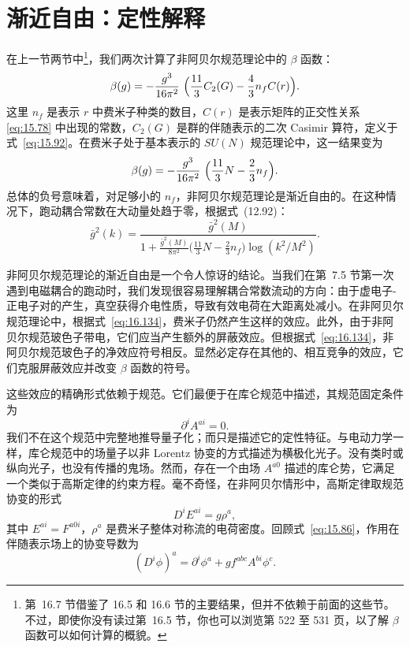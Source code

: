 \section{渐近自由：定性解释}

在上一节两节中\footnote{第~16.7 节借鉴了 16.5 和 16.6 节的主要结果，但并不依赖于前面的这些节。不过，即使你没有读过第~16.5 节，你也可以浏览第 522 至 531 页，以了解 $\beta$ 函数可以如何计算的概貌。}，我们两次计算了非阿贝尔规范理论中的 $\beta$ 函数：
\begin{equation}
  \beta(g) = -\frac{g^3}{16\pi^2}\ \Bigl( \frac{11}{3}C_2(G)
    - \frac{4}{3}n_fC(r) \Bigr) .
  \label{eq:16.134}
\end{equation}
这里 $n_f$ 是表示 $r$ 中费米子种类的数目，$C(r)$ 是表示矩阵的正交性关系 \eqref{eq:15.78} 中出现的常数，$C_2(G)$ 是群的伴随表示的二次 Casimir 算符，定义于式~\eqref{eq:15.92}。在费米子处于基本表示的 $SU(N)$ 规范理论中，这一结果变为
\begin{equation}
  \beta(g) = -\frac{g^3}{16\pi^2}\ \Bigl( \frac{11}{3}N
    - \frac{2}{3}n_f \Bigr) .
  \label{eq:16.135}
\end{equation}
总体的负号意味着，对足够小的 $n_f$，非阿贝尔规范理论是渐近自由的。在这种情况下，跑动耦合常数在大动量处趋于零，根据式~(12.92)：
\begin{equation}
  \bar{g}^2(k) = \frac{\bar{g}^2(M)}{1 +
    \frac{\bar{g}^2(M)}{8\pi^2}\bigl( \frac{11}{3}N - \frac{2}{3}n_f
      \bigr)\log(k^2/M^2)} .
  \label{eq:16.136}
\end{equation}

非阿贝尔规范理论的渐近自由是一个令人惊讶的结论。当我们在第~7.5 节第一次遇到电磁耦合的跑动时，我们发现很容易理解耦合常数流动的方向：由于虚电子-正电子对的产生，真空获得介电性质，导致有效电荷在大距离处减小。在非阿贝尔规范理论中，根据式~\eqref{eq:16.134}，费米子仍然产生这样的效应。此外，由于非阿贝尔规范玻色子带电，它们应当产生额外的屏蔽效应。但根据式~\eqref{eq:16.134}，非阿贝尔规范玻色子的净效应符号相反。显然必定存在其他的、相互竞争的效应，它们克服屏蔽效应并改变 $\beta$ 函数的符号。

这些效应的精确形式依赖于规范。它们最便于在库仑规范中描述，其规范固定条件为
\begin{equation}
  \partial^i A^{ai} = 0 .
  \label{eq:16.137}
\end{equation}
我们不在这个规范中完整地推导量子化；而只是描述它的定性特征。与电动力学一样，库仑规范中的场量子以非 Lorentz 协变的方式描述为横极化光子。没有类时或纵向光子，也没有传播的鬼场。然而，存在一个由场 $A^{a0}$ 描述的库仑势，它满足一个类似于高斯定律的约束方程。毫不奇怪，在非阿贝尔情形中，高斯定律取规范协变的形式
\begin{equation}
  D^iE^{ai} = g\rho^a ,
  \label{eq:16.138}
\end{equation}
其中 $E^{ai} = F^{a0i}$，$\rho^a$ 是费米子整体对称流的电荷密度。回顾式~\eqref{eq:15.86}，作用在伴随表示场上的协变导数为
\begin{equation}
  (D^i\phi)^a = \partial^i\phi^a + gf^{abc}A^{bi}\phi^c .
\end{equation}

